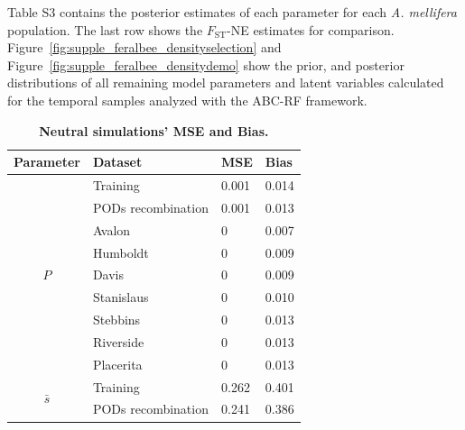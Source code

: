 \documentclass[a4paper, 12pt]{article}
\begin{document}
Table S3 contains the posterior estimates of each parameter for each \textit{A. mellifera} population. The last row shows the $F_{\mathrm{ST}}$-NE estimates for comparison. Figure~\ref{fig:supple_feralbee_densityselection} and Figure~\ref{fig:supple_feralbee_densitydemo} show the prior, and posterior distributions of all remaining model parameters and latent variables calculated for the temporal samples analyzed with the ABC-RF framework.\\

\begin{table}[ht]
\caption{\textbf{Neutral simulations' MSE and Bias.}}
\centering
\begin{tabular}{clll}
\hline
\multicolumn{1}{l}{Parameter}            & Dataset            & MSE   & Bias  \\ 
\hline
\multirow{9}{*}{$P$}                            & Training           & 0.001  & 0.014  \\
                                                           & PODs recombination & 0.001 & 0.013 \\
                                                           & Avalon             &  0     & 0.007 \\
                                                           & Humboldt        & 0      & 0.009  \\
                                                           & Davis               & 0      & 0.009  \\
                                                           & Stanislaus       & 0       & 0.010 \\
                                                           & Stebbins          & 0      & 0.013  \\
                                                           & Riverside         & 0      & 0.013  \\
                                                           & Placerita          &  0     & 0.013  \\ 
\hline
\multirow{9}{*}{$\bar{s}$}                    & Training           & 0.262  & 0.401 \\
                                                           & PODs recombination & 0.241 & 0.386 \\

\end{tabular}
\end{table}
\end{document}
